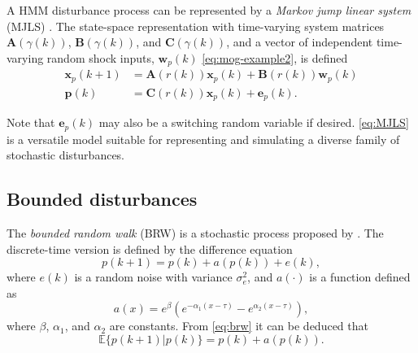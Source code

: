 {A \gls{HMM} disturbance process can be represented by a \textit{Markov jump linear system} (\acrshort{MJLS}) \citep{costa_discrete-time_2005}. The state-space representation with time-varying system matrices $\mathbf{A}(\gamma(k))$, $\mathbf{B}(\gamma(k))$, and $\mathbf{C}(\gamma(k))$, and a vector of independent time-varying random shock inputs, $\mathbf{w}_p(k)$ \eqref{eq:mog-example2}, is defined
\begin{equation} \label{eq:MJLS}
	\begin{aligned}
	\mathbf{x}_p(k+1) &= \mathbf{A}(r(k)) \mathbf{x}_p(k) + \mathbf{B}(r(k))\mathbf{w}_p(k) \\
	\mathbf{p}(k) &= \mathbf{C}(r(k)) \mathbf{x}_p(k) + \mathbf{e}_p(k).
	\end{aligned}
\end{equation}

Note that $\mathbf{e}_p(k)$ may also be a switching random variable if desired. \eqref{eq:MJLS} is a versatile model suitable for representing and simulating a diverse family of stochastic disturbances.

\subsection{Bounded disturbances} \label{sec:bounded}

The \textit{bounded random walk} (\gls{BRW}) is a stochastic process proposed by \cite{nicolau_stationary_2002}. The discrete-time version is defined by the difference equation
\begin{equation} \label{eq:brw}
		p(k+1) = p(k) + a(p(k)) + e(k),
\end{equation}
where $e(k)$ is a random noise with variance $\sigma_e^2$, and $a(\cdot)$ is a function defined as
%
%
%
%
\begin{equation}
	a(x) = e^{\beta}\left(e^{-\alpha_{1}\left(x - \tau\right)} - e^{\alpha_{2}\left(x - \tau\right)}\right),
\end{equation}
where $\beta$, $\alpha_{1}$, and $\alpha_{2}$ are constants.  From \eqref{eq:brw} it can be deduced that
\begin{equation}
	\mathbb{E}\{p(k+1)|p(k)\} = p(k) + a(p(k)).
\end{equation}

}
